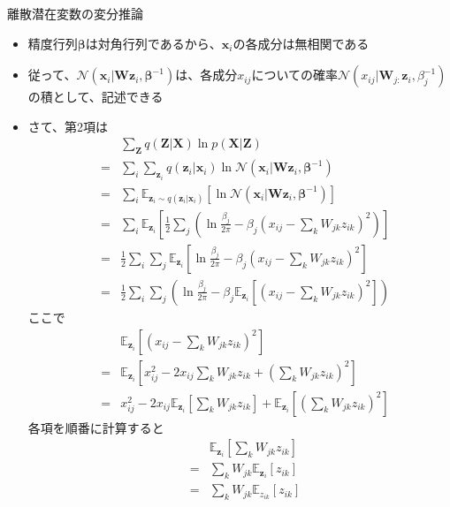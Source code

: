 \documentclass[dvipdfmx,notheorems,t]{beamer}
\begin{document}
\begin{frame}{離散潜在変数の変分推論}
\begin{itemize}
\begin{itemize}
		\item 精度行列$\bm{\beta}$は対角行列であるから、$\bm{x}_i$の各成分は\alert{無相関}である
		\item 従って、$\mathcal{N}(\bm{x}_i | \bm{W} \bm{z}_i, \bm{\beta}^{-1})$は、各成分$x_{ij}$についての確率$\mathcal{N}(x_{ij} | \bm{W}_{j:} \bm{z}_i, \beta_j^{-1})$の積として、記述できる
		\newline
		
		\item さて、第2項は
		\begin{eqnarray}
			&& \sum_{\bm{Z}} q(\bm{Z} | \bm{X}) \ln p(\bm{X} | \bm{Z}) \nonumber \\
			&=& \sum_i \sum_{\bm{z}_i} q(\bm{z}_i | \bm{x}_i) \ln \mathcal{N}(\bm{x}_i | \bm{W} \bm{z}_i, \bm{\beta}^{-1}) \\
			&=& \sum_i \mathbb{E}_{\bm{z}_i \sim q(\bm{z}_i | \bm{x}_i)} \left[ \ln \mathcal{N}(\bm{x}_i | \bm{W} \bm{z}_i, \bm{\beta}^{-1}) \right] \\
			&=& \sum_i \mathbb{E}_{\bm{z}_i} \left[ \frac{1}{2} \sum_j \left( \ln \frac{\beta_j}{2\pi} - \beta_j \left( x_{ij} - \sum_k W_{jk} z_{ik} \right)^2 \right) \right] \\
			&=& \frac{1}{2} \sum_i \sum_j \mathbb{E}_{\bm{z}_i} \left[ \ln \frac{\beta_j}{2\pi} - \beta_j \left( x_{ij} - \sum_k W_{jk} z_{ik} \right)^2 \right] \\
			&=& \frac{1}{2} \sum_i \sum_j \left( \ln \frac{\beta_j}{2\pi} - \beta_j \mathbb{E}_{\bm{z}_i} \left[ \left( x_{ij} - \sum_k W_{jk} z_{ik} \right)^2 \right] \right)
		\end{eqnarray}
		ここで
		\begin{eqnarray}
			&& \mathbb{E}_{\bm{z}_i} \left[ \left( x_{ij} - \sum_k W_{jk} z_{ik} \right)^2 \right] \nonumber \\
			&=& \mathbb{E}_{\bm{z}_i} \left[ x_{ij}^2 - 2 x_{ij} \sum_k W_{jk} z_{ik} + \left( \sum_k W_{jk} z_{ik} \right)^2 \right] \\
			&=& x_{ij}^2 - 2 x_{ij} \mathbb{E}_{\bm{z}_i} \left[ \sum_k W_{jk} z_{ik} \right] + \mathbb{E}_{\bm{z}_i} \left[ \left( \sum_k W_{jk} z_{ik} \right)^2 \right]
		\end{eqnarray}
		各項を順番に計算すると
		\begin{eqnarray}
			&& \mathbb{E}_{\bm{z}_i} \left[ \sum_k W_{jk} z_{ik} \right] \nonumber \\
			&=& \sum_k W_{jk} \mathbb{E}_{\bm{z}_i} \left[ z_{ik} \right] \\
			&=& \sum_k W_{jk} \mathbb{E}_{z_{ik}} \left[ z_{ik} \right] \\

\end{eqnarray}
\end{itemize}
\end{itemize}
\end{frame}
\end{document}
